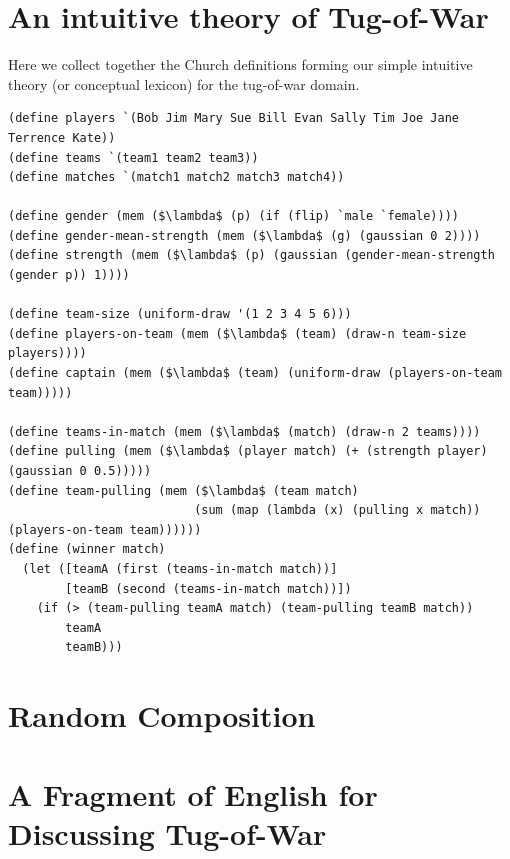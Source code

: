 \documentclass[12pt]{article}
\begin{document}
\section{An intuitive theory of Tug-of-War}
\label{tow}
Here we collect together the Church definitions forming our simple intuitive theory (or conceptual lexicon) for the tug-of-war domain.
 \begin{lstlisting}[mathescape]
(define players `(Bob Jim Mary Sue Bill Evan Sally Tim Joe Jane Terrence Kate))
(define teams `(team1 team2 team3))
(define matches `(match1 match2 match3 match4))

(define gender (mem ($\lambda$ (p) (if (flip) `male `female))))
(define gender-mean-strength (mem ($\lambda$ (g) (gaussian 0 2))))
(define strength (mem ($\lambda$ (p) (gaussian (gender-mean-strength (gender p)) 1))))

(define team-size (uniform-draw '(1 2 3 4 5 6)))
(define players-on-team (mem ($\lambda$ (team) (draw-n team-size players))))
(define captain (mem ($\lambda$ (team) (uniform-draw (players-on-team team)))))

(define teams-in-match (mem ($\lambda$ (match) (draw-n 2 teams))))
(define pulling (mem ($\lambda$ (player match) (+ (strength player) (gaussian 0 0.5)))))
(define team-pulling (mem ($\lambda$ (team match) 
                          (sum (map (lambda (x) (pulling x match)) (players-on-team team))))))
(define (winner match) 
  (let ([teamA (first (teams-in-match match))]
        [teamB (second (teams-in-match match))])
    (if (> (team-pulling teamA match) (team-pulling teamB match))
        teamA
        teamB)))
\end{lstlisting}


\section{Random Composition}

\section{A Fragment of English for Discussing Tug-of-War}
\end{document}
